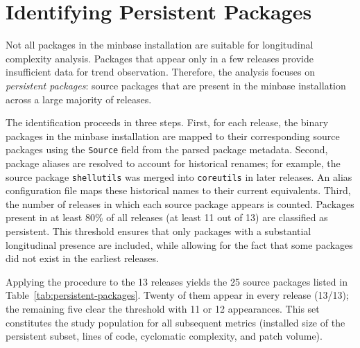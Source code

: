 \section{Identifying Persistent Packages}
\label{sec:persistent}

Not all packages in the minbase installation are suitable for longitudinal complexity analysis. Packages that appear only in a few releases provide insufficient data for trend observation. Therefore, the analysis focuses on \emph{persistent packages}: source packages that are present in the minbase installation across a large majority of releases.

The identification proceeds in three steps. First, for each release, the binary packages in the minbase installation are mapped to their corresponding source packages using the \texttt{Source} field from the parsed package metadata. Second, package aliases are resolved to account for historical renames; for example, the source package \texttt{shellutils} was merged into \texttt{coreutils} in later releases. An alias configuration file maps these historical names to their current equivalents. Third, the number of releases in which each source package appears is counted. Packages present in at least 80\% of all releases (at least 11 out of 13) are classified as persistent. This threshold ensures that only packages with a substantial longitudinal presence are included, while allowing for the fact that some packages did not exist in the earliest releases.

Applying the procedure to the 13 releases yields the 25 source packages listed in Table~\ref{tab:persistent-packages}. Twenty of them appear in every release (13/13); the remaining five clear the threshold with 11 or 12 appearances. This set constitutes the study population for all subsequent metrics (installed size of the persistent subset, lines of code, cyclomatic complexity, and patch volume).

